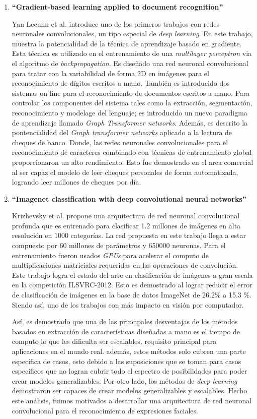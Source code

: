 \begin{enumerate}

\item{\textbf{“Gradient-based learning applied to document recognition” \cite{2lecun1998gradient}}

 Yan Lecunn  et al. introduce uno de los primeros trabajos con redes neuronales convolucionales, un tipo especial de \textit{deep learning}. En este trabajo, muestra la potencialidad de la técnica de aprendizaje basado en gradiente. Esta técnica es utilizado en el entrenamiento de una \textit{multilayer perceptron} via el algoritmo de \textit{backpropagation}. Es diseñado una red neuronal convolucional para tratar con la variabilidad de forma 2D en imágenes para el reconocimiento de dígitos escritos a mano. También es introducido dos sistemas on-line para el reconocimiento de documentos escritos a mano. Para controlar los componentes del sistema tales como la extracción, segmentación, reconocimiento y modelage del lenguaje; es introducido un nuevo paradigma de aprendizaje llamado \textit{Graph Transformer networks}. Además, es descrito la pontencialidad del \textit{Graph transformer networks} aplicado a la lectura de cheques de banco. Donde, las redes neuronales convolucionales para el reconocimiento de caracteres combinado con técnicas de entrenamiento global proporcionaron un alto rendimiento. Esto fue demostrado en el area comercial al ser capaz el modelo de leer cheques personales de forma automatizada, logrando leer millones de cheques por día. 
}
\item{\textbf{“Imagenet classification with deep convolutional neural networks” \cite{8krizhevsky2012imagenet}}
 
Krizhevsky et al. propone una arquitectura de red neuronal convolucional profunda que es entrenado para clasificar 1.2 millones de imágenes en alta resolución en 1000 categorías. La red propuesta en este trabajo llega a estar compuesto por 60 millones de parámetros y 650000 neuronas. Para el entrenamiento fueron usados \textit{GPUs} para acelerar el computo de multiplicaciones matriciales requeridas en las operaciones de convolución. Este trabajo logra el estado del arte en clasificación de imágenes a gran escala en la competición ILSVRC-2012. Esto es demostrado al lograr reducir el error de clasificación de imágenes en la base de datos ImageNet de 26.2\% a 15.3 \%. Siendo así, uno de los trabajos con más impacto en visión por computador. 

Así, es demostrado que una de las principales desventajas de los métodos basados en extracción de características diseñadas a mano es el tiempo de computo lo que les dificulta ser escalables, requisito principal para aplicaciones en el mundo real. además, estos métodos solo cubren una parte específica de casos, esto debido a las suposiciones que se toman para casos específicos que no logran cubrir todo el espectro de posibilidades para poder crear modelos generalizables. Por otro lado, los métodos de \textit{deep learning} demostraron ser capaces de crear modelos generalizables y escalables. Hecho este análisis, fuimos motivados a desarrollar una arquitectura de red neuronal convolucional para el reconocimiento de expresiones faciales.
}
\end{enumerate}
